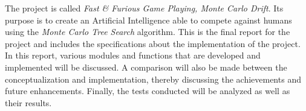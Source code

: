 The project is called \emph{Fast \& Furious Game Playing, Monte Carlo Drift}. Its purpose is to create an Artificial Intelligence able to compete against humans using the \emph{Monte Carlo Tree Search} algorithm.
This is the final report for the  project and includes the specifications about the implementation of the project. In this report, various modules and functions that are developed and implemented will be discussed. A comparison will also be made between the conceptualization and implementation, thereby discussing the achievements and future enhancements.
Finally, the tests conducted will be analyzed as well as their results.












